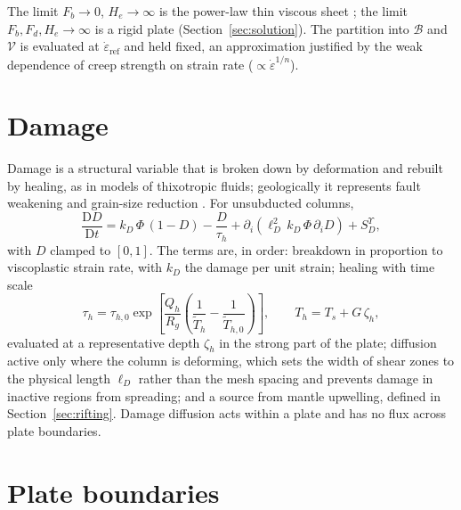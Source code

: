 \documentclass[11pt]{article}
\newcommand{\Tk}{\tilde{T}}
\begin{document}
The limit $F_b\to0$, $H_e\to\infty$ is the power-law thin viscous sheet
\cite{EnglandMcKenzie1982}; the limit $F_b, F_d, H_e \to \infty$ is a rigid
plate (Section~\ref{sec:solution}). The partition into $\mathcal{B}$ and
$\mathcal{V}$ is evaluated at $\dot\varepsilon_{\mathrm{ref}}$ and held fixed,
an approximation justified by the weak dependence of creep strength on strain
rate ($\propto\dot\varepsilon^{1/n}$).

\section{Damage}
\label{sec:damage}

Damage is a structural variable that is broken down by deformation and rebuilt
by healing, as in models of thixotropic fluids; geologically it represents fault
weakening and grain-size reduction \cite{BercoviciRicard2012}. For unsubducted
columns,
\begin{equation}
  \frac{\mathrm{D}D}{\mathrm{D}t}
  = k_D\,\Phi\,(1-D)
  - \frac{D}{\tau_h}
  + \partial_i\!\left(\ell_D^2\,k_D\,\Phi\,\partial_i D\right)
  + S_D^{\Upsilon},
  \label{eq:damage}
\end{equation}
with $D$ clamped to $[0,1]$. The terms are, in order: breakdown in proportion to
viscoplastic strain rate, with $k_D$ the damage per unit strain; healing with
time scale
\begin{equation}
  \tau_h = \tau_{h,0}\exp\!\left[\frac{Q_h}{R_g}\left(\frac{1}{\Tk_h}-\frac{1}{\Tk_{h,0}}\right)\right],
  \qquad T_h = T_s + G\,\zeta_h,
\end{equation}
evaluated at a representative depth $\zeta_h$ in the strong part of the plate;
diffusion active only where the column is deforming, which sets the width of
shear zones to the physical length $\ell_D$ rather than the mesh spacing and
prevents damage in inactive regions from spreading; and a source from mantle
upwelling, defined in Section~\ref{sec:rifting}. Damage diffusion acts within a
plate and has no flux across plate boundaries.

\section{Plate boundaries}
\label{sec:boundaries}
\end{document}
